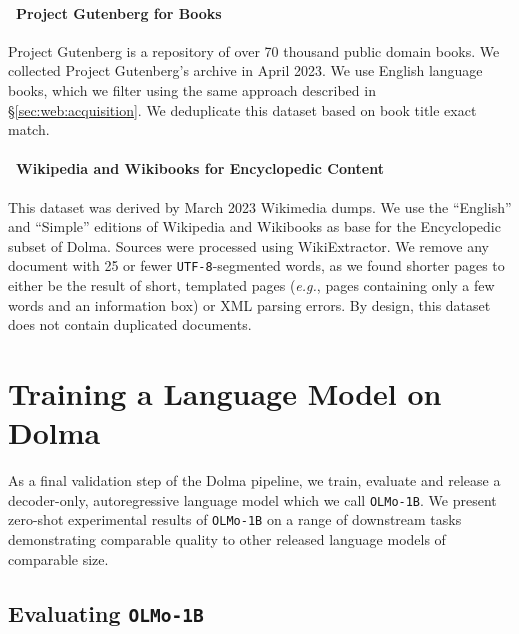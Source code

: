 \documentclass{article}
\newcommand{\dolma}{Dolma\xspace}
\newcommand{\dolmaRefs}{{\color{VarnishPapaThree}\faBookmark}\xspace}
\newcommand{\dolmaBooks}{{\color{VarnishGolfThree}\faBook}\xspace}
\newcommand{\utf}{\texttt{UTF-8}\xspace}
\newcommand{\OlmoTiny}{\texttt{OLMo-1B}\xspace}
\begin{document}
\paragraph{\dolmaBooks~Project Gutenberg for Books} 
Project Gutenberg is a repository of over 70 thousand public domain books. 
We collected Project Gutenberg's archive in April 2023. 
We use English language books, which we filter using the same approach described in \S\ref{sec:web:acquisition}.
We deduplicate this dataset based on book title exact match. 

\paragraph{\dolmaRefs~Wikipedia and Wikibooks for Encyclopedic Content} 

This dataset was derived by March 2023 Wikimedia dumps. 
We use the ``English'' and ``Simple'' editions of Wikipedia and Wikibooks as base for the Encyclopedic subset of \dolma. 
Sources were processed using WikiExtractor\citep{wikiextractor2023}.
We remove any document with 25 or fewer \utf-segmented words, as we found shorter pages to either be the result of short, templated pages (\textit{e.g.}, pages containing only a few words and an information box) or XML parsing errors.
By design, this dataset does not contain duplicated documents.

\section{Training a Language Model on \dolma}
\label{sec:using}

As a final validation step of the \dolma pipeline, we train, evaluate and release a decoder-only, autoregressive language model which we call \OlmoTiny.  
We present zero-shot experimental results of \OlmoTiny on a range of downstream tasks demonstrating comparable quality to other released language models of comparable size.

\subsection{Evaluating \OlmoTiny}
\label{sec:evaluating-1b}
\end{document}
